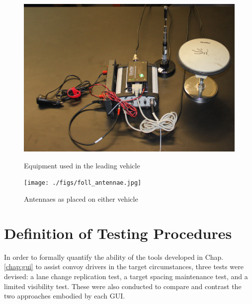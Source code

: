 \begin{figure}[ht] \centering
    \begin{minipage}[b]{0.45\linewidth} \centering 
        \includegraphics[width=\textwidth]{./figs/lead_hardware.jpg}
        \caption{Equipment used in the leading vehicle} \label{fig:hardwarelead}
    \end{minipage}
    \hspace{0.5cm}
    \begin{minipage}[b]{0.45\linewidth} \centering
        \texttt{[image: ./figs/foll\_antennae.jpg]} 
        \caption{Antennaes as placed on either vehicle} \label{fig:antennaefoll}
    \end{minipage}
\end{figure}




\section{Definition of Testing Procedures} \label{sec:test}

In order to formally quantify the ability of the tools developed in Chap. \ref{chap:gui} to assist convoy drivers in the target circumstances, three tests were devised: a lane change replication test, a target spacing maintenance test, and a limited visibility test. These were also conducted to compare and contrast the two approaches embodied by each GUI. 

